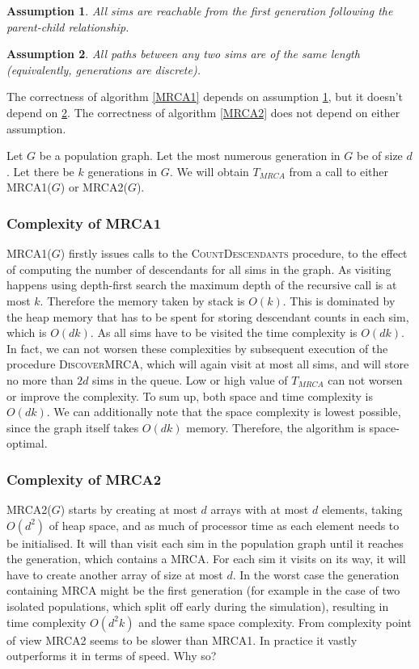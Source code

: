 \documentclass{l4proj}
\newtheorem{assum}{Assumption}
\begin{document}
\begin{assum}\label{reachability}
  All sims are reachable from the first generation following the parent-child relationship.
\end{assum}

\begin{assum}\label{discreteGen}
  All paths between any two sims are of the same length (equivalently, generations are discrete).
\end{assum}

The correctness of algorithm \ref{MRCA1} depends on assumption \ref{reachability}, but it doesn't depend on \ref{discreteGen}. The correctness of algorithm \ref{MRCA2} does not depend on either assumption.

Let $G$ be a population graph. Let the most numerous generation in $G$ be of size $d$. Let there be $k$ generations in $G$. We will obtain $T_{MRCA}$ from a call to either \textsc{MRCA1}($G$) or \textsc{MRCA2}($G$).

\subsubsection{Complexity of \textsc{MRCA1}}
\textsc{MRCA1}($G$) firstly issues calls to the \textsc{CountDescendants} procedure, to the effect of computing the number of descendants for all sims in the graph. As visiting happens using depth-first search the maximum depth of the recursive call is at most $k$. Therefore the memory taken by stack is $O(k)$. This is dominated by the heap memory that has to be spent for storing descendant counts in each sim, which is $O(dk)$. As all sims have to be visited the time complexity is $O(dk)$. In fact, we can not worsen these complexities by subsequent execution of the procedure \textsc{DiscoverMRCA}, which will again visit at most all sims, and will store no more than $2d$ sims in the queue. Low or high value of $T_{MRCA}$ can not worsen or improve the complexity. To sum up, both space and time complexity is $O(dk)$. We can additionally note that the space complexity is lowest possible, since the graph itself takes $O(dk)$ memory. Therefore, the algorithm is space-optimal.

\subsubsection{Complexity of \textsc{MRCA2}}
\textsc{MRCA2}($G$) starts by creating at most $d$ arrays with at most $d$ elements, taking $O(d^{2})$ of heap space, and as much of processor time as each element needs to be initialised. It will than visit each sim in the population graph until it reaches the generation, which contains a MRCA. For each sim it visits on its way, it will have to create another array of size at most $d$. In the worst case the generation containing MRCA might be the first generation (for example in the case of two isolated populations, which split off early during the simulation), resulting in time complexity $O(d^{2}k)$ and the same space complexity. From complexity point of view \textsc{MRCA2} seems to be slower than \textsc{MRCA1}. In practice it vastly outperforms it in terms of speed. Why so?
\end{document}
